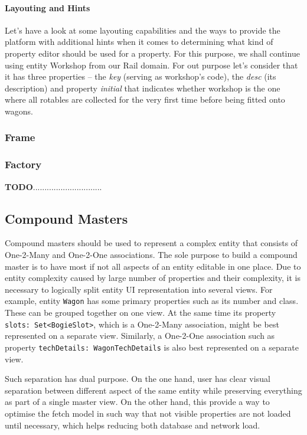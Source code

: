   \paragraph{Layouting and Hints}
  
  Let's have a look at some layouting capabilities and the ways to provide the platform with additional hints when it comes to determining what kind of property editor should be used for a property.
  For this purpose, we shall continue using entity Workshop from our Rail domain.
  For out purpose let's consider that it has three properties -- the \emph{key} (serving as workshop's code), the \emph{desc} (its description) and property \emph{initial} that indicates whether workshop is the one where all rotables are collected for the very first time before being fitted onto wagons.
  
  \subsubsection{Frame}
  
  \subsubsection{Factory}  
  
  
  \textbf{TODO}..............................
  
\subsection{Compound Masters}

  Compound masters should be used to represent a complex entity that consists of One-2-Many and One-2-One associations.
  The sole purpose to build a compound master is to have most if not all aspects of an entity editable in one place.
  Due to entity complexity caused by large number of properties and their complexity, it is necessary to logically split entity UI representation into several views.
  For example, entity \texttt{Wagon} has some primary properties such as its number and class.
  These can be grouped together on one view.
  At the same time its property \texttt{slots: Set<BogieSlot>}, which is a One-2-Many association, might be best represented on a separate view.
  Similarly, a One-2-One association such as property \texttt{techDetails: WagonTechDetails} is also best represented on a separate view.
  
  Such separation has dual purpose.
  On the one hand, user has clear visual separation between different aspect of the same entity while preserving everything as part of a single master view.
  On the other hand, this provide a way to optimise the fetch model in such way that not visible properties are not loaded until necessary, which helps reducing both database and network load.
  
